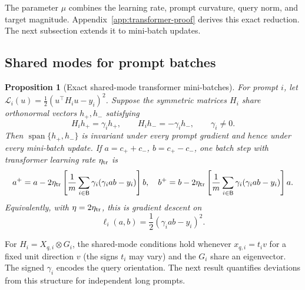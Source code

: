 \documentclass[11pt]{article}
\newtheorem{proposition}[theorem]{Proposition}
\begin{document}
The parameter \(\mu\) combines the learning rate, prompt curvature, query
norm, and target magnitude.  Appendix~\ref{app:transformer-proof} derives
this exact reduction.  The next subsection extends it to mini-batch updates.

\subsection{Shared modes for prompt batches}

\begin{proposition}[Exact shared-mode transformer mini-batches]
\label{prop:shared-mode}
For prompt \(i\), let
\(\mathcal L_i(u)=\frac12(u^\top H_i u-y_i)^2\).  Suppose the symmetric
matrices \(H_i\) share orthonormal vectors \(h_+,h_-\) satisfying
\[
    H_i h_+=\gamma_i h_+,\qquad
    H_i h_-=-\gamma_i h_-,
    \qquad \gamma_i\ne0.
\]
Then \(\operatorname{span}\{h_+,h_-\}\) is invariant under every prompt
gradient and hence under every mini-batch update.  If
\(a=c_++c_-\), \(b=c_+-c_-\), one batch step with transformer learning rate
\(\eta_{\rm tr}\) is
\[
\begin{split}
    a^+=a-2\eta_{\rm tr}
    \left[\frac1m\sum_{i\in\mathsf B}
    \gamma_i(\gamma_iab-y_i)\right]b,\quad
    b^+=b-2\eta_{\rm tr}
    \left[\frac1m\sum_{i\in\mathsf B}
    \gamma_i(\gamma_iab-y_i)\right]a.
\end{split}
\]
Equivalently, with \(\eta=2\eta_{\rm tr}\), this is gradient descent on
\begin{equation}
\label{eq:sample-loss}
    \ell_i(a,b)=\frac12(\gamma_iab-y_i)^2.
\end{equation}
\end{proposition}

For \(H_i=X_{q,i}\otimes G_i\), the shared-mode conditions hold whenever
\(x_{q,i}=t_i v\) for a fixed unit direction \(v\) (the signs \(t_i\) may
vary) and the \(G_i\) share an eigenvector.  The signed \(\gamma_i\) encodes
the query orientation.  The next result quantifies deviations from this
structure for independent long prompts.
\end{document}
